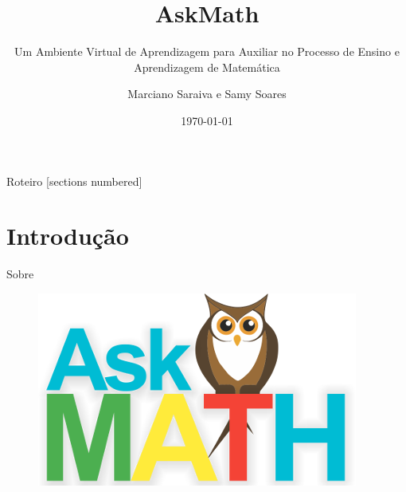 \documentclass[10pt]{beamer}
\title{AskMath}
\subtitle{Um Ambiente Virtual de Aprendizagem para Auxiliar no Processo de Ensino e Aprendizagem de Matem\'atica}
\date{\today}
\author{Marciano Saraiva e Samy Soares}
\institute{Universidade Federal do Cear\'a - Campus de Quixad\'a}
\begin{document}
\maketitle

\begin{frame}{Roteiro}
  [sections numbered]
  \tableofcontents[hideallsubsections]
\end{frame}

\section{Introdu\c{c}\~ao}

\begin{frame}{Sobre}

\begin{figure}[H]
  \centering
   \begin{minipage}[b]{0.25\textwidth}\end{minipage}
  \hfill
  \begin{minipage}[b]{0.3\textwidth}
	\includegraphics[width=\textwidth]{figuras/askmath.png}
  \end{minipage}
  \hfill
  \begin{minipage}[b]{0.1\textwidth}

\end{minipage}
\end{figure}
\end{frame}
\end{document}
